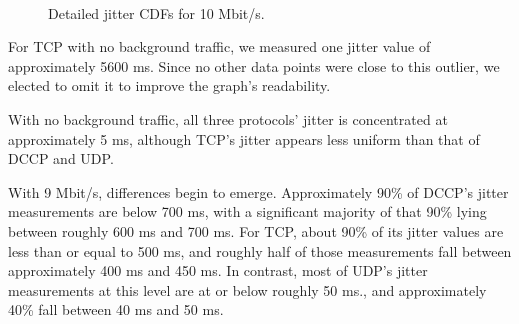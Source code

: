 \begin{figure}[!t]
   \centering
  \\ 
   \caption{Detailed jitter CDFs for 10 Mbit/s.}
\label{fig:jitter_detail_10}
\end{figure}

For TCP with no background traffic, we measured one jitter value of
approximately 5600 ms. Since no other data points were close to this outlier, we
elected to omit it to improve the graph's readability.

With no background traffic, all three protocols' jitter is concentrated at
approximately 5 ms, although TCP's jitter appears less uniform than that of DCCP
and UDP.

With 9 Mbit/s, differences begin to emerge. Approximately 90\% of DCCP's jitter
measurements are below 700 ms, with a significant majority of that 90\% lying
between roughly 600 ms and 700 ms. For TCP, about 90\% of its jitter values are
less than or equal to 500 ms, and roughly half of those measurements fall
between approximately 400 ms and 450 ms. In contrast, most of UDP's jitter
measurements at this level are at or below roughly 50 ms., and approximately
40\% fall between 40 ms and 50 ms.

